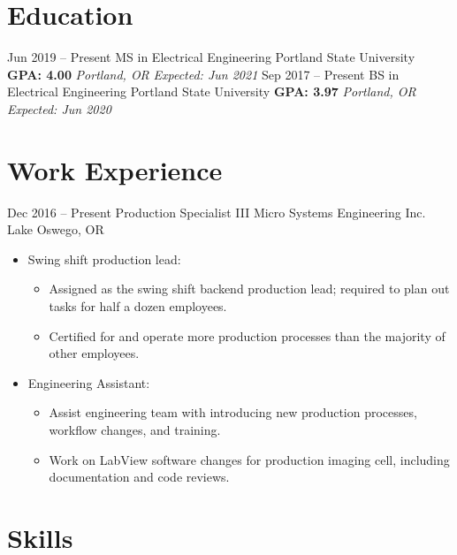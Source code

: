 \documentclass[letterpaper]{moderncv}        %
\begin{document}
\makecvtitle
\vspace*{-.8cm}
    
\section{Education}

\cventry
{Jun 2019 -- Present}
{MS in Electrical Engineering}
{Portland State University}
{\textbf{GPA: 4.00}}
{\textit{Portland, OR}}
{\textit{Expected: Jun 2021}}
{}
\cventry
{Sep 2017 -- Present}
{BS in Electrical Engineering}
{Portland State University}
{\textbf{GPA: 3.97}}
{\textit{Portland, OR}}
{\textit{Expected: Jun 2020}}
{}
\vspace{-2mm}
\section{Work Experience}
\cventry
{Dec 2016 -- Present}
{Production Specialist III}
{Micro Systems Engineering Inc.}
{Lake Oswego, OR}
{}
{\begin{itemize}%
	\item Swing shift production lead: 
	{\begin{itemize}
		\item Assigned as the swing shift backend production lead; required to plan out tasks for half a dozen employees.
		\item Certified for and operate more production processes than the majority of other employees.
	\end{itemize}}
	\item Engineering Assistant:
	{\begin{itemize}
		\item Assist engineering team with introducing new production processes, workflow changes, and training.
		\item Work on LabView software changes for production imaging cell, including documentation and code reviews.
		\end{itemize}}
	\end{itemize}}
\vspace{-2mm}
\section{Skills}
	\vspace{-2mm}
\end{document}
